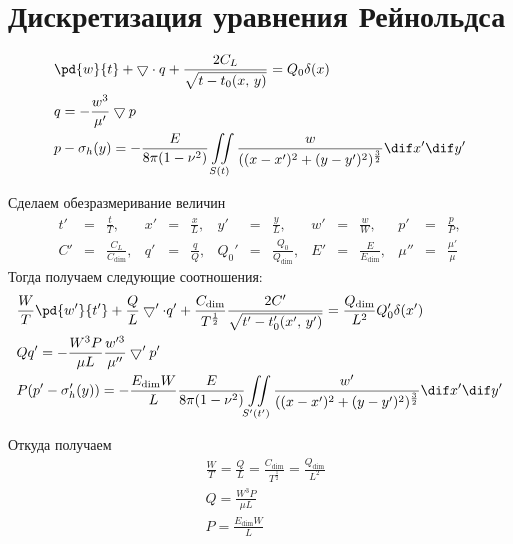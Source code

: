 \chapter{Дискретизация уравнения Рейнольдса}
\label{section:discrete_reynolds}
\begin{align}
    & \pd{w}{t} + \bigtriangledown \cdot q + \frac{2C_L}{\sqrt{t-t_0(x,\, y)}}  = Q_0 \delta(x) \\
    & q  = -\frac{w^3}{\mu'} \bigtriangledown p \\
    & p-\sigma_h(y)  = -\frac{E}{8\pi (1-\nu^2)}\iint\limits_{S(t)}\frac{w}{((x-x')^2 + (y-y')^2)^\frac{3}{2}} \dif x' \dif y' \\
\end{align}

Сделаем обезразмеривание величин
\begin{equation}
    \begin{array}{rclrclrclrclrcl}
        t' & = & \frac{t}{T}, &
        x' & = & \frac{x}{L}, &
        y' & = & \frac{y}{L}, &
        w' & = & \frac{w}{W}, &
        p' & = & \frac{p}{P}, \\
        C' & = & \frac{C_L}{C_\text{dim}}, &
        q' & = & \frac{q}{Q}, &
        Q_0' & = & \frac{Q_0}{Q_\text{dim}}, &
        E' & = & \frac{E}{E_\text{dim}}, &
        \mu'' & = & \frac{\mu'}{\mu}
    \end{array}
\end{equation}
Тогда получаем следующие соотношения:
\begin{align}
    & \frac{W}{T}\pd{w'}{t'} + \frac{Q}{L}\bigtriangledown' \cdot q' + \frac{C_\text{dim}}{T^\frac{1}{2}}\frac{2C'}{\sqrt{t'-t_0'(x',\, y')}}  = \frac{Q_\text{dim}}{L^2}Q_0' \delta(x') \\
    & Q q' = -\frac{W^3 P}{\mu L}\frac{w'^3}{\mu''} \bigtriangledown' p' \\
    & P(p'-\sigma_h'(y))  = -\frac{E_\text{dim}W}{L}\frac{E}{8\pi (1-\nu^2)}\iint\limits_{S'(t')}\frac{w'}{((x-x')^2 + (y-y')^2)^\frac{3}{2}} \dif x' \dif y' \\
\end{align}

Откуда получаем
\begin{align}
    & \frac{W}{T} = \frac{Q}{L} =  \frac{C_\text{dim}}{T^\frac{1}{2}} = \frac{Q_\text{dim}}{L^2} \\
    & Q = \frac{W^3 P}{\mu L} \\
    & P = \frac{E_\text{dim}W}{L}
\end{align}

